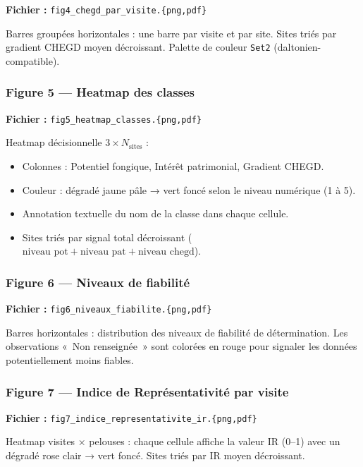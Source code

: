 \documentclass[11pt,a4paper]{article}
\begin{document}
\textbf{Fichier :} \texttt{fig4\_chegd\_par\_visite.\{png,pdf\}}

Barres groupées horizontales : une barre par visite et par site. Sites triés par gradient
CHEGD moyen décroissant. Palette de couleur \texttt{Set2} (daltonien-compatible).

\subsubsection{Figure 5 — Heatmap des classes}

\textbf{Fichier :} \texttt{fig5\_heatmap\_classes.\{png,pdf\}}

Heatmap décisionnelle $3 \times N_{\text{sites}}$ :
\begin{itemize}
  \item Colonnes : Potentiel fongique, Intérêt patrimonial, Gradient CHEGD.
  \item Couleur : dégradé jaune pâle → vert foncé selon le niveau numérique (1 à 5).
  \item Annotation textuelle du nom de la classe dans chaque cellule.
  \item Sites triés par signal total décroissant ($\text{niveau pot} + \text{niveau pat} + \text{niveau chegd}$).
\end{itemize}

\subsubsection{Figure 6 — Niveaux de fiabilité}

\textbf{Fichier :} \texttt{fig6\_niveaux\_fiabilite.\{png,pdf\}}

Barres horizontales : distribution des niveaux de fiabilité de détermination.
Les observations «~Non renseignée~» sont colorées en rouge pour signaler les données
potentiellement moins fiables.

\subsubsection{Figure 7 — Indice de Représentativité par visite}

\textbf{Fichier :} \texttt{fig7\_indice\_representativite\_ir.\{png,pdf\}}

Heatmap visites × pelouses : chaque cellule affiche la valeur IR (0--1) avec un dégradé
rose clair → vert foncé. Sites triés par IR moyen décroissant.

\end{document}
